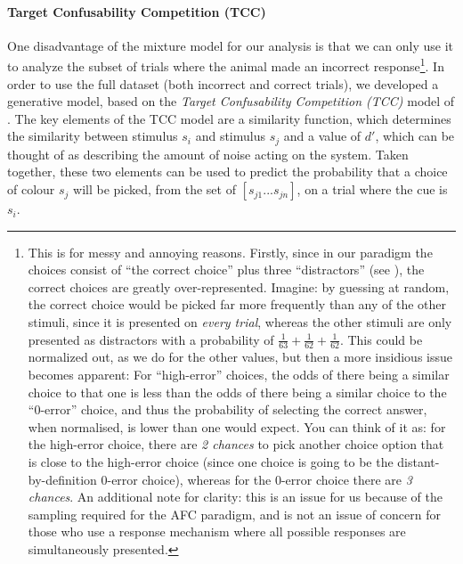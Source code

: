 \paragraph{Target Confusability Competition (TCC)}\label{para:TCC}
One disadvantage of the mixture model for our analysis is that we can only use it to analyze the subset of trials where the animal made an incorrect response\footnote{
This is for messy and annoying reasons. 
Firstly, since in our paradigm the choices consist of ``the correct choice'' plus three ``distractors'' (see ), the correct choices are greatly over-represented. 
Imagine: by guessing at random, the correct choice would be picked far more frequently than any of the other stimuli, since it is presented on \emph{every trial}, whereas the other stimuli are only presented as distractors with a probability of $\frac{1}{63} + \frac{1}{62} + \frac{1}{62}$. 
This could be normalized out, as we do for the other values, but then a more insidious issue becomes apparent: 
For ``high-error'' choices, the odds of there being a similar choice to that one is less than the odds of there being a similar choice to the ``0-error'' choice, and thus the probability of selecting the correct answer, when normalised, is lower than one would expect. 
You can think of it as: for the high-error choice, there are \emph{2 chances} to pick another choice option that is close to the high-error choice (since one choice is going to be the distant-by-definition 0-error choice), whereas for the 0-error choice there are \emph{3 chances}.
An additional note for clarity: this is an issue for us because of the sampling required for the AFC paradigm, and is not an issue of concern for those who use a response mechanism where all possible responses are simultaneously presented.
}.
In order to use the full dataset (both incorrect and correct trials), we developed a generative model, based on the \emph{Target Confusability Competition (TCC)} model of \cite{schurgin_psychophysical_2020}.
The key elements of the TCC model are a similarity function, which determines the similarity between stimulus $s_i$ and stimulus $s_j$ and a value of $d'$, which can be thought of as describing the amount of noise acting on the system. 
Taken together, these two elements can be used to predict the probability that a choice of colour $s_j$ will be picked, from the set of $[s_{j1} ... s_{jn}]$, on a trial where the cue is $s_i$.
